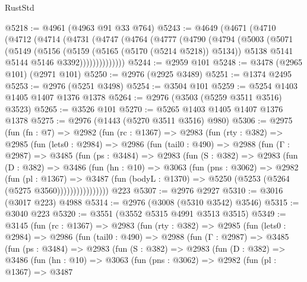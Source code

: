 \begin{lexlean}{RustStd}
\begin{coremodule}
@5218 := @4961 (@4963 @91 @33 @764)
@5243 := @4649
    (@4671
      (@4710
        (@4712
          (@4714
            (@4731
              (@4747
                (@4764
                  (@4777
                    (@4790
                      (@4794
                        (@5003
                          (@5071
                            (@5149
                              (@5156
                                (@5159 (@5165 (@5170 (@5214 @5218)) @5134))
                                @5138
                                @5141
                                @5144
                                @5146
                                @3392))))))))))))))
@5244 := @2959 @101
@5248 := @3478 (@2965 @101) (@2971 @101)
@5250 := @2976 (@2925 @3489)
@5251 := @1374 @2495
@5253 := @2976 (@5251 @3498)
@5254 := @3504 @101
@5259 := @5254 @1403 @1405 @1407 @1376 @1378
@5264 := @2976 (@3503 (@5259 @3511 @3516) @3523)
@5265 := @3526 @101
@5270 := @5265 @1403 @1405 @1407 @1376 @1378
@5275 := @2976 (@1443 (@5270 @3511 @3516) @980)
@5306 := @2975
    (fun (fn : @7) =>
    @2982
      (fun (rc : @1367) =>
      @2983
        (fun (rty : @382) =>
        @2985
          (fun (lets0 : @2984) =>
          @2986
            (fun (tail0 : @490) =>
            @2988
              (fun (Γ : @2987) =>
              @3485
                (fun (ps : @3484) =>
                @2983
                  (fun (S : @382) =>
                  @2983
                    (fun (D : @382) =>
                    @3486
                      (fun (hn : @10) =>
                      @3063
                        (fun (pns : @3062) =>
                        @2982
                          (fun (pl : @1367) =>
                          @3487
                            (fun (bodyL : @1370) => @5250 (@5253 (@5264 (@5275 @3560))))))))))))))))
    @223
@5307 := @2976 @2927
@5310 := @3016 (@3017 @223) @4988
@5314 := @2976 (@3008 (@5310 @3542) @3546)
@5315 := @3040 @223
@5320 := @3551 (@3552 @5315 @4991 @3513 @3515)
@5349 := @3145
    (fun (rc : @1367) =>
    @2983
      (fun (rty : @382) =>
      @2985
        (fun (lets0 : @2984) =>
        @2986
          (fun (tail0 : @490) =>
          @2988
            (fun (Γ : @2987) =>
            @3485
              (fun (ps : @3484) =>
              @2983
                (fun (S : @382) =>
                @2983
                  (fun (D : @382) =>
                  @3486
                    (fun (hn : @10) =>
                    @3063
                      (fun (pns : @3062) =>
                      @2982
                        (fun (pl : @1367) =>
                        @3487

\end{coremodule}
\end{lexlean}
